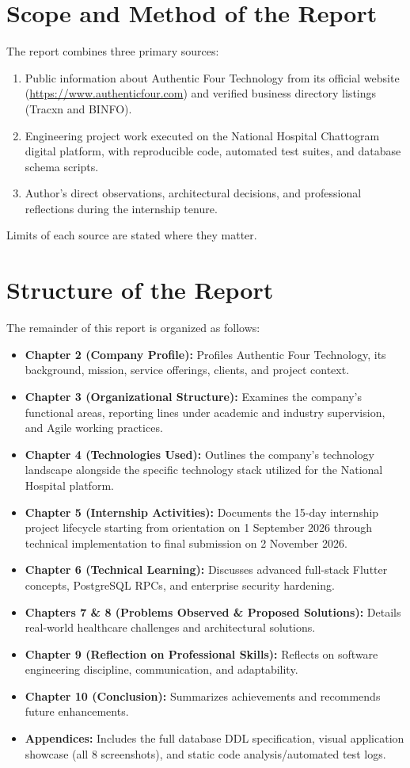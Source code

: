 \documentclass[11pt,a4paper,oneside]{report}
\begin{document}
\section{Scope and Method of the Report}
The report combines three primary sources:
\begin{enumerate}
    \item Public information about Authentic Four Technology from its official website (\url{https://www.authenticfour.com}) and verified business directory listings (Tracxn and BINFO).
    \item Engineering project work executed on the National Hospital Chattogram digital platform, with reproducible code, automated test suites, and database schema scripts.
    \item Author's direct observations, architectural decisions, and professional reflections during the internship tenure.
\end{enumerate}
Limits of each source are stated where they matter.

\section{Structure of the Report}
The remainder of this report is organized as follows:
\begin{itemize}
    \item \textbf{Chapter 2 (Company Profile):} Profiles Authentic Four Technology, its background, mission, service offerings, clients, and project context.
    \item \textbf{Chapter 3 (Organizational Structure):} Examines the company's functional areas, reporting lines under academic and industry supervision, and Agile working practices.
    \item \textbf{Chapter 4 (Technologies Used):} Outlines the company's technology landscape alongside the specific technology stack utilized for the National Hospital platform.
    \item \textbf{Chapter 5 (Internship Activities):} Documents the 15-day internship project lifecycle starting from orientation on 1 September 2026 through technical implementation to final submission on 2 November 2026.
    \item \textbf{Chapter 6 (Technical Learning):} Discusses advanced full-stack Flutter concepts, PostgreSQL RPCs, and enterprise security hardening.
    \item \textbf{Chapters 7 \& 8 (Problems Observed \& Proposed Solutions):} Details real-world healthcare challenges and architectural solutions.
    \item \textbf{Chapter 9 (Reflection on Professional Skills):} Reflects on software engineering discipline, communication, and adaptability.
    \item \textbf{Chapter 10 (Conclusion):} Summarizes achievements and recommends future enhancements.
    \item \textbf{Appendices:} Includes the full database DDL specification, visual application showcase (all 8 screenshots), and static code analysis/automated test logs.
\end{itemize}
\end{document}
